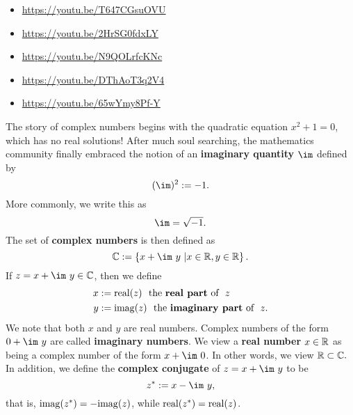 \begin{itemize} 

\item \url{https://youtu.be/T647CGsuOVU}

\item \url{https://youtu.be/2HrSG0fdxLY}

\item \url{https://youtu.be/N9QOLrfcKNc}

\item \url{https://youtu.be/DThAoT3q2V4}

\item \url{https://youtu.be/65wYmy8Pf-Y}

\end{itemize}

The story of complex numbers begins with the quadratic equation $x^2 + 1=0$, which has no real solutions! After much soul searching, the mathematics community finally embraced the notion of an \textbf{imaginary quantity} $\im$ defined by
\begin{equation}
    \label{eq:ImaginaryQuanity}
    (\im)^2:= -1. 
\end{equation}
More commonly, we write this as 
\begin{equation}
    \label{eq:ImaginaryQuanity02}
    \im= \sqrt{-1}. 
\end{equation}
The set of \textbf{complex numbers} is then defined as 
\begin{equation}
    \label{eq:ComlexNumbers}
    \cp:=\left\{x + \im~ y~| x\in \real, y \in \real \right\}. 
\end{equation}
If $z=x+ \im~ y \in \cp$, then we define
\begin{equation}
    \label{eq:RealImagParts}
    \begin{aligned}
    x&:= \mathrm{real} ( z )~~\text{the {\bf real part} of}~~z\\
    y&:= \mathrm{imag} ( z )~~\text{the {\bf imaginary part} of}~~z.
    \end{aligned}
\end{equation}
We note that both $x$ and $y$ are real numbers. Complex numbers of the form $0 + \im~y$ are called \textbf{imaginary numbers}. We view a \textbf{real number} $x\in \mathbb R$ as being a complex number of the form $x + \im~0$. In other words, we view $\mathbb R \subset \mathbb C.$ In addition, we define the \textbf{complex conjugate} of $z=x+\im~y$ to be
\begin{equation}
    \label{eq:complexConjugate}
z^\ast:= x - \im~y,
\end{equation}
that is, $\mathrm{imag} ( z^\ast ) = - \mathrm{imag} ( z )$, while $\mathrm{real} ( z^\ast )=\mathrm{real} ( z )$.
\vspace*{0.2cm}


